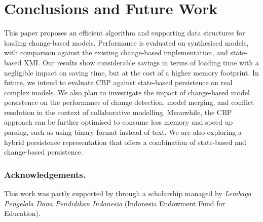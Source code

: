 \documentclass{llncs}
\begin{document}
    \vspace{-5pt}
    \section{Conclusions and Future Work}
    \label{sec:conclusions}
    This paper proposes an efficient algorithm and supporting data structures for loading change-based models.  Performance is evaluated on synthesised models, with comparison against the existing change-based implementation, and state-based XMI. Our results show considerable savings in terms of loading time with a negligible impact on saving time, but at the cost of a higher memory footprint.  In future, we intend to evaluate CBP against state-based persistence on real complex models.  We also plan to investigate the impact of change-based model persistence on the performance of change detection, model merging, and conflict resolution in the context of collaborative modelling. Meanwhile, the CBP approach can be further optimised to consume less memory and speed up parsing, such as using binary format instead of text. We are also exploring a hybrid persistence representation that offers a combination of state-based and change-based persistence. 
    
    \subsubsection*{Acknowledgements.} This work was partly supported by through a scholarship managed by \emph{Lembaga Pengelola Dana Pendidikan Indonesia} (Indonesia Endowment Fund for Education).
     
    
   
\end{document}
